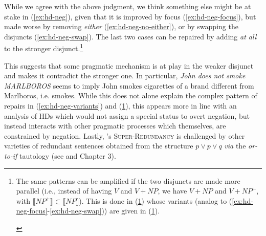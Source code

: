 While we agree with the above judgment, we think something else might be at stake in (\ref{ex:hd-neg}), given that it is improved by focus (\ref{ex:hd-neg-focus}), but made worse by removing \textit{either} (\ref{ex:hd-neg-no-either}), or by swapping the disjuncts (\ref{ex:hd-neg-swap}). The last two cases can be repaired by adding \textit{at all} to the stronger disjunct.\footnote{The same patterns can be amplified if the two disjuncts are made more parallel (i.e., instead of having $V$ and $V+NP$, we have $V+NP$ and $V+NP^+$, with $\llbracket NP^+\rrbracket \subset \llbracket NP\rrbracket$). This is done in (\ref{ex:hd-neg-parallel}) whose variants (analog to (\ref{ex:hd-neg-focus}-\ref{ex:hd-neg-swap})) are given in (\ref{ex:hd-neg-parallel-variants}).
	\begin{exe}
		\label{ex:hd-neg-parallel}
		\ex \label{ex:hd-neg-parallel-variants}
		\begin{xlist}
		\end{xlist}
\end{exe}}

\begin{exe}
	\ex \label{ex:hd-neg-variants}
	\begin{xlist}
		\label{ex:hd-neg-focus}
		\label{ex:hd-neg-no-either}
		\label{ex:hd-neg-swap}
	\end{xlist}
\end{exe}



This suggests that some pragmatic mechanism is at play in the weaker disjunct and makes it contradict the stronger one. In particular, \textit{John does not smoke MARLBOROS} seems to imply John smokes cigarettes of a brand different from Marlboros, i.e. smokes. While this does not alone explain the complex pattern of repairs in (\ref{ex:hd-neg-variants}) and (\ref{ex:hd-neg-parallel-variants}), this appears more in line with an analysis of HDs which would not assign a special status to overt negation, but instead interacts with other pragmatic processes which themselves, are constrained by negation. Lastly, \cite{Kalomoiros2024}'s \textsc{Super-Redundancy} is challenged by other varieties of redundant sentences obtained from the structure $p\vee p \vee q$ \textit{via} the \textit{or-to-if} tautology (see  and Chapter 3).

